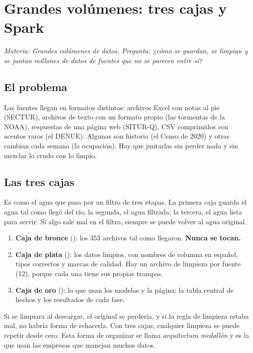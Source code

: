 \chapter{Grandes volúmenes: tres cajas y Spark}
\label{cap:s-cajas}
\textit{Materia: Grandes volúmenes de datos. Pregunta: ¿cómo se guardan, se limpian y se juntan millones de datos de
fuentes que no se parecen entre sí?}

\section{El problema}
Las fuentes llegan en formatos distintos: archivos Excel con notas al pie (SECTUR), archivos de texto con un formato
propio (las tormentas de la NOAA), respuestas de una página web (SITUR-Q), CSV comprimidos con acentos raros (el DENUE).
Algunas son historia (el Censo de 2020) y otras cambian cada semana (la ocupación). Hay que juntarlas sin perder nada y sin
mezclar lo crudo con lo limpio.

\section{Las tres cajas}
\begin{intuicion}
Es como el agua que pasa por un filtro de tres etapas. La primera caja guarda el agua tal como llegó del río; la segunda,
el agua filtrada; la tercera, el agua lista para servir. Si algo sale mal en el filtro, siempre se puede volver al agua
original.
\end{intuicion}

\begin{enumerate}
\item \textbf{Caja de bronce} (): los 353 archivos tal como llegaron. \textbf{Nunca se tocan.}
\item \textbf{Caja de plata} (): los datos limpios, con nombres de columna en español, tipos
  correctos y marcas de calidad. Hay un archivo de limpieza por fuente (12), porque cada una tiene sus propias trampas.
\item \textbf{Caja de oro} (): lo que usan los modelos y la página: la tabla central de hechos y los
  resultados de cada fase.
\end{enumerate}

\begin{porque}
Si se limpiara al descargar, el original se perdería, y si la regla de limpieza estaba mal, no habría forma de rehacerla.
Con tres cajas, cualquier limpieza se puede repetir desde cero. Esta forma de organizar se llama \emph{arquitectura
medallón} y es la que usan las empresas que manejan muchos datos.
\end{porque}

